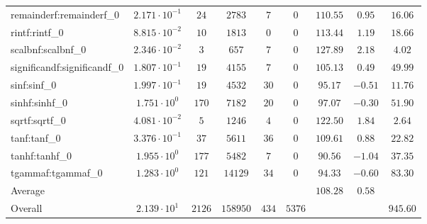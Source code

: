 \begin{tabular}{|l|c|c|c|c|c|c|c|c|}
remainderf:remainderf\_0     & $ 2.171 \cdot 10^{-1} $ & $ 24     $ & $ 2783   $ & $ 7   $ & $ 0    $ & $ 110.55      $ & $ 0.95    $ & $ 16.06   $ \\
rintf:rintf\_0               & $ 8.815 \cdot 10^{-2} $ & $ 10     $ & $ 1813   $ & $ 0   $ & $ 0    $ & $ 113.44      $ & $ 1.19    $ & $ 18.66   $ \\
scalbnf:scalbnf\_0           & $ 2.346 \cdot 10^{-2} $ & $ 3      $ & $ 657    $ & $ 7   $ & $ 0    $ & $ 127.89      $ & $ 2.18    $ & $ 4.02    $ \\
significandf:significandf\_0 & $ 1.807 \cdot 10^{-1} $ & $ 19     $ & $ 4155   $ & $ 7   $ & $ 0    $ & $ 105.13      $ & $ 0.49    $ & $ 49.99   $ \\
sinf:sinf\_0                 & $ 1.997 \cdot 10^{-1} $ & $ 19     $ & $ 4532   $ & $ 30  $ & $ 0    $ & $ 95.17       $ & $ -0.51   $ & $ 11.76   $ \\
sinhf:sinhf\_0               & $ 1.751 \cdot 10^{0}  $ & $ 170    $ & $ 7182   $ & $ 20  $ & $ 0    $ & $ 97.07       $ & $ -0.30   $ & $ 51.90   $ \\
sqrtf:sqrtf\_0               & $ 4.081 \cdot 10^{-2} $ & $ 5      $ & $ 1246   $ & $ 4   $ & $ 0    $ & $ 122.50      $ & $ 1.84    $ & $ 2.64    $ \\
tanf:tanf\_0                 & $ 3.376 \cdot 10^{-1} $ & $ 37     $ & $ 5611   $ & $ 36  $ & $ 0    $ & $ 109.61      $ & $ 0.88    $ & $ 22.82   $ \\
tanhf:tanhf\_0               & $ 1.955 \cdot 10^{0}  $ & $ 177    $ & $ 5482   $ & $ 7   $ & $ 0    $ & $ 90.56       $ & $ -1.04   $ & $ 37.35   $ \\
tgammaf:tgammaf\_0           & $ 1.283 \cdot 10^{0}  $ & $ 121    $ & $ 14129  $ & $ 34  $ & $ 0    $ & $ 94.33       $ & $ -0.60   $ & $ 83.30   $ \\
\hline
Average                      & $                     $ & $        $ & $        $ & $     $ & $      $ & $ 108.28      $ & $ 0.58    $ & $         $ \\
\hline
Overall                      & $ 2.139 \cdot 10^{1}  $ & $ 2126   $ & $ 158950 $ & $ 434 $ & $ 5376 $ & $             $ & $         $ & $ 945.60  $ \\
\hline
\end{tabular}
